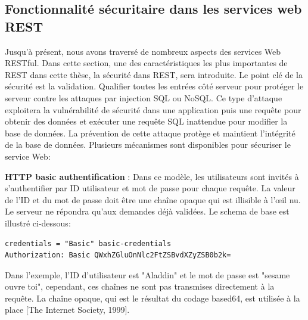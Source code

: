 \subsection{Fonctionnalité sécuritaire dans les services web REST}
Jusqu'à présent, nous avons traversé de nombreux aspects des services Web RESTful. Dans cette section, une des caractéristiques les plus importantes de REST dans cette thèse, la sécurité dans REST, sera introduite. Le point clé de la sécurité est la validation. Qualifier toutes les entrées côté serveur pour protéger le serveur contre les attaques par injection SQL ou NoSQL. Ce type d'attaque exploitera la vulnérabilité de sécurité dans une application puis une requête pour obtenir des données et exécuter une requête SQL inattendue pour modifier la base de données. La prévention de cette attaque protège et maintient l'intégrité de la base de données.
Plusieurs mécanismes sont disponibles pour sécuriser le service Web:

\textbf{HTTP basic authentification} : Dans ce modèle, les utilisateurs sont invités à s'authentifier par ID utilisateur et mot de passe pour chaque requête. La valeur de l'ID et du mot de passe doit être une chaîne opaque qui est illisible à l'œil nu. Le serveur ne répondra qu'aux demandes déjà validées. Le schema de base est illustré ci-dessous:
\begin{verbatim}
credentials = "Basic" basic-credentials 
Authorization: Basic QWxhZGluOnNlc2FtZSBvdXZyZSB0b2k=
\end{verbatim}
Dans l'exemple, l'ID d'utilisateur est "Aladdin" et le mot de passe est "sesame ouvre toi", cependant, ces chaînes ne sont pas transmises directement à la requête. La chaîne opaque, qui est le résultat du codage based64, est utilisée à la place [The Internet Society, 1999].

